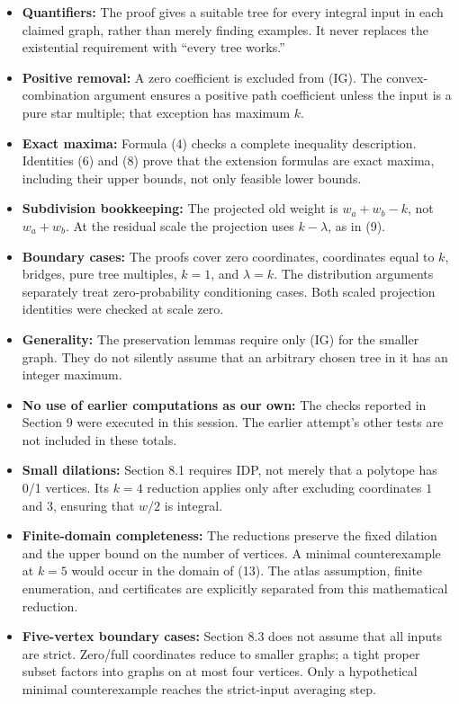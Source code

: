 \documentclass{article}
\begin{document}
\begin{itemize}
\item
  \textbf{Quantifiers:} The proof gives a suitable tree for every integral input in each claimed graph, rather than merely finding examples. It never replaces the existential requirement with ``every tree works.''
\item
  \textbf{Positive removal:} A zero coefficient is excluded from (IG). The convex-combination argument ensures a positive path coefficient unless the input is a pure star multiple; that exception has maximum \(k\).
\item
  \textbf{Exact maxima:} Formula (4) checks a complete inequality description. Identities (6) and (8) prove that the extension formulas are exact maxima, including their upper bounds, not only feasible lower bounds.
\item
  \textbf{Subdivision bookkeeping:} The projected old weight is \(w_a+w_b-k\), not \(w_a+w_b\). At the residual scale the projection uses \(k-\lambda\), as in (9).
\item
  \textbf{Boundary cases:} The proofs cover zero coordinates, coordinates equal to \(k\), bridges, pure tree multiples, \(k=1\), and \(\lambda=k\). The distribution arguments separately treat zero-probability conditioning cases. Both scaled projection identities were checked at scale zero.
\item
  \textbf{Generality:} The preservation lemmas require only (IG) for the smaller graph. They do not silently assume that an arbitrary chosen tree in it has an integer maximum.
\item
  \textbf{No use of earlier computations as our own:} The checks reported in Section 9 were executed in this session. The earlier attempt's other tests are not included in these totals.
\item
  \textbf{Small dilations:} Section 8.1 requires IDP, not merely that a polytope has 0/1 vertices. Its \(k=4\) reduction applies only after excluding coordinates \(1\) and \(3\), ensuring that \(w/2\) is integral.
\item
  \textbf{Finite-domain completeness:} The reductions preserve the fixed dilation and the upper bound on the number of vertices. A minimal counterexample at \(k=5\) would occur in the domain of (13). The atlas assumption, finite enumeration, and certificates are explicitly separated from this mathematical reduction.
\item
  \textbf{Five-vertex boundary cases:} Section 8.3 does not assume that all inputs are strict. Zero/full coordinates reduce to smaller graphs; a tight proper subset factors into graphs on at most four vertices. Only a hypothetical minimal counterexample reaches the strict-input averaging step.

\end{itemize}
\end{document}
